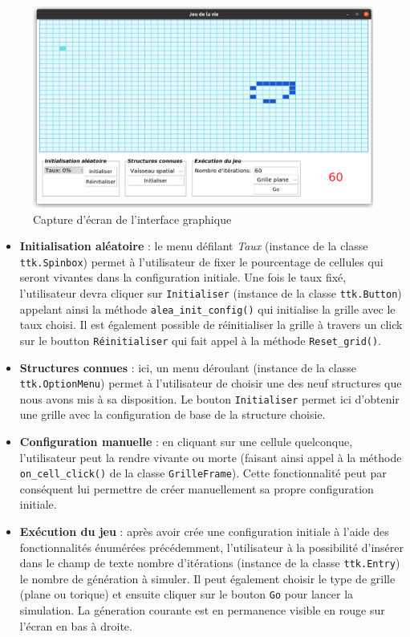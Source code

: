 \documentclass[11pt]{article}
\begin{document}
\begin{figure}[!h]
\includegraphics[width=\linewidth]{./images/jdv_exemple.png} \vspace*{-0.5cm}
\caption{Capture d'écran de l'interface graphique}
\end{figure}

\begin{itemize}
    \item {\bf Initialisation aléatoire} : le menu défilant {\it Taux} (instance de la classe \texttt{ttk.Spinbox}) permet à l'utilisateur de fixer le pourcentage de cellules qui seront vivantes dans la configuration initiale. Une fois le taux fixé, l'utilisateur devra cliquer sur \texttt{Initialiser} (instance de la classe \texttt{ttk.Button}) appelant ainsi la méthode \texttt{alea_init_config()} qui initialise la grille avec le taux choisi. Il est également possible de réinitialiser la grille à travers un click sur le boutton \texttt{Réinitialiser} qui fait appel à la méthode \texttt{Reset_grid()}.
    \item {\bf Structures connues} : ici, un menu déroulant (instance de la classe \texttt{ttk.OptionMenu}) permet à l'utilisateur de choisir une des neuf structures que nous avons mis à sa disposition. Le bouton \texttt{Initialiser} permet ici d'obtenir une grille avec la configuration de base de la structure choisie.
    \item {\bf Configuration manuelle} : en cliquant sur une cellule quelconque, l'utilisateur peut la rendre vivante ou morte (faisant ainsi appel à la méthode \texttt{on_cell_click()} de la classe \texttt{GrilleFrame}).
    Cette fonctionnalité peut par conséquent lui permettre de créer manuellement sa propre configuration initiale.
    \item {\bf Exécution du jeu} : après avoir crée une configuration initiale à l'aide des fonctionnalités énumérées précédemment, l'utilisateur à la possibilité d'insérer dans le champ de texte nombre d'itérations (instance de la classe \texttt{ttk.Entry}) le nombre de génération à simuler. Il peut également choisir le type de grille (plane ou torique) et ensuite cliquer sur le bouton \texttt{Go} pour lancer la simulation. La géneration courante est en permanence visible en rouge sur l'écran en bas à droite.
\end{itemize}
\end{document}
